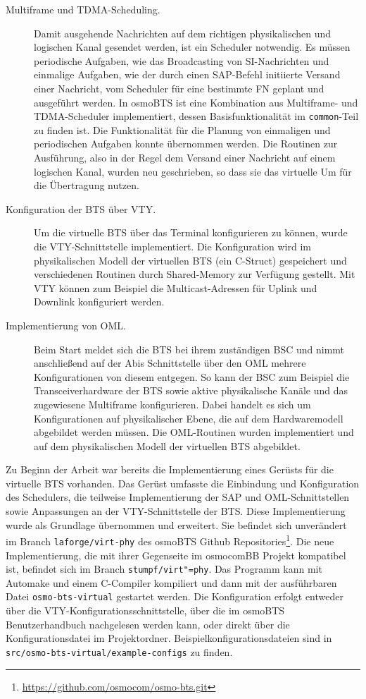 \begin{description}
\item[Multiframe und \ac{TDMA}-Scheduling.] Damit ausgehende Nachrichten auf dem richtigen physikalischen und logischen Kanal gesendet werden, ist ein Scheduler notwendig. Es müssen periodische Aufgaben, wie das Broadcasting von \ac{SI}-Nachrichten und einmalige Aufgaben, wie der durch einen \ac{SAP}-Befehl initiierte Versand einer Nachricht, vom Scheduler für eine bestimmte \ac{FN} geplant und ausgeführt werden. In osmoBTS ist eine Kombination aus Multiframe- und \ac{TDMA}-Scheduler implementiert, dessen Basisfunktionalität im \texttt{common}-Teil zu finden ist. Die Funktionalität für die Planung von einmaligen und periodischen Aufgaben konnte übernommen werden. Die Routinen zur Ausführung, also in der Regel dem Versand einer Nachricht auf einem logischen Kanal, wurden neu geschrieben, so dass sie das virtuelle \ac{Um} für die Übertragung nutzen.
\item[Konfiguration der \ac{BTS} über \ac{VTY}.] Um die virtuelle \ac{BTS} über das Terminal konfigurieren zu können, wurde die \ac{VTY}-Schnittstelle implementiert. Die Konfiguration wird im physikalischen Modell der virtuellen \ac{BTS} (ein C-Struct) gespeichert und verschiedenen Routinen durch Shared-Memory zur Verfügung gestellt. Mit \ac{VTY} können zum Beispiel die Multicast-Adressen für Uplink und Downlink konfiguriert werden.
\item[Implementierung von \ac{OML}.] Beim Start meldet sich die \ac{BTS} bei ihrem zuständigen \ac{BSC} und nimmt anschließend auf der Abis Schnittstelle über den \ac{OML} mehrere Konfigurationen von diesem entgegen. So kann der \ac{BSC} zum Beispiel die Transceiverhardware der \ac{BTS} sowie aktive physikalische Kanäle und das zugewiesene Multiframe konfigurieren. Dabei handelt es sich um Konfigurationen auf physikalischer Ebene, die auf dem Hardwaremodell abgebildet werden müssen. Die \ac{OML}-Routinen wurden implementiert und auf dem physikalischen Modell der virtuellen \ac{BTS} abgebildet.
\end{description}

Zu Beginn der Arbeit war bereits die Implementierung eines Gerüsts für die virtuelle \ac{BTS} vorhanden. Das Gerüst umfasste die Einbindung und Konfiguration des Schedulers, die teilweise Implementierung der \ac{SAP} und \ac{OML}-Schnittstellen sowie Anpassungen an der \ac{VTY}-Schnittstelle der \ac{BTS}. Diese Implementierung wurde als Grundlage übernommen und erweitert. Sie befindet sich unverändert im Branch \texttt{laforge/virt-phy} des osmoBTS Github Repositories\footnote{\url{https://github.com/osmocom/osmo-bts.git}}. Die neue Implementierung, die mit ihrer Gegenseite im osmocomBB Projekt kompatibel ist, befindet sich im Branch \texttt{stumpf/virt"=phy}. Das Programm kann mit Automake und einem C-Compiler kompiliert und dann mit der ausführbaren Datei \texttt{osmo-bts-virtual} gestartet werden. Die Konfiguration erfolgt entweder über die \ac{VTY}-Konfigurationsschnittstelle, über die im osmoBTS Benutzerhandbuch nachgelesen werden kann, oder direkt über die Konfigurationsdatei im Projektordner. Beispielkonfigurationsdateien sind in \texttt{src/osmo-bts-virtual/example-configs} zu finden.

